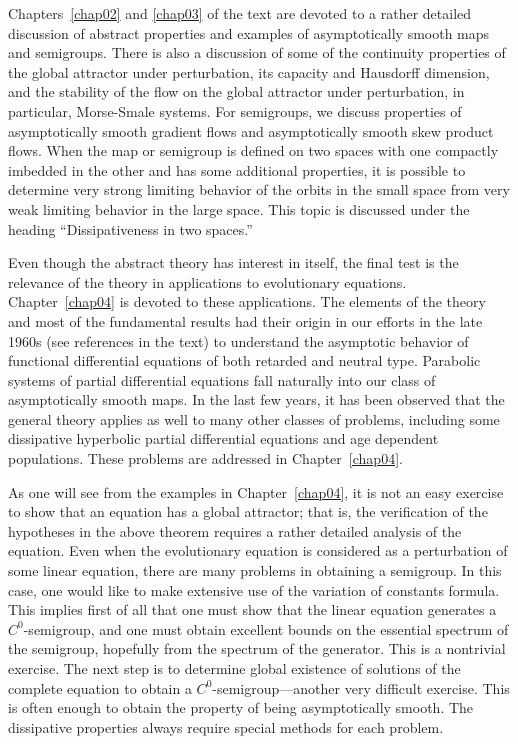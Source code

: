 \documentclass{surv-l}
\theoremstyle{plain}
\theoremstyle{definition}
\numberwithin{equation}{section}
\numberwithin{figure}{chapter}
\begin{document}
Chapters~\ref{chap02} and \ref{chap03} of the text are devoted to a rather detailed discussion of abstract properties and examples of asymptotically smooth maps and semigroups. There is also a discussion of some of the continuity properties of the global attractor under perturbation, its capacity and Hausdorff dimension, and the stability of the flow on the global attractor under perturbation, in particular, Morse-Smale systems. For semigroups, we discuss properties of asymptotically smooth gradient flows and asymptotically smooth skew product flows. When the map or semigroup is defined on two spaces with one compactly imbedded in the other and has some additional properties, it is possible to determine very strong limiting behavior of the orbits in the small space from very weak limiting behavior in the large space. This topic is discussed under the heading ``Dissipativeness in two spaces.''

Even though the abstract theory has interest in itself, the final test is the relevance of the theory in applications to evolutionary equations. Chapter~\ref{chap04} is devoted to these applications. The elements of the theory and most of the fundamental results had their origin in our efforts in the late 1960s (see references in the text) to understand the asymptotic behavior of functional differential equations of both retarded and neutral type. Parabolic systems of partial differential equations fall naturally into our class of asymptotically smooth maps. In the last few years, it has been observed that the general theory applies as well to many other classes of problems, including some dissipative hyperbolic partial differential equations and age dependent populations. These problems are addressed in Chapter~\ref{chap04}.

As one will see from the examples in Chapter~\ref{chap04}, it is not an easy exercise to show that an equation
has a global attractor; that is, the verification of the hypotheses in the above theorem requires a rather detailed analysis of the equation. Even when the evolutionary equation is considered as a perturbation of some linear equation, there are many problems in obtaining a semigroup. In this case, one would like to make extensive use of the variation of constants formula. This implies first of all that one must show that the linear equation generates a $C^{0}$-semigroup, and one must obtain excellent bounds on the essential spectrum of the semigroup, hopefully from the spectrum of the generator. This is a nontrivial exercise. The next step is to determine global existence of solutions of the complete equation to obtain a $C^{0}$-semigroup---another very difficult exercise. This is often enough to obtain the property of being asymptotically smooth. The dissipative properties always require special methods for each problem.
\end{document}
